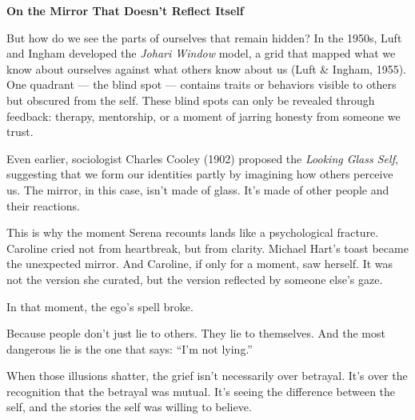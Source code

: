 \begin{PsychologicalSidebar}{\textbf{On the Mirror That Doesn’t Reflect Itself}}
  \medskip
  
  But how do we see the parts of ourselves that remain hidden? In the 1950s, Luft and Ingham 
  developed the \textit{Johari Window} model, a grid that mapped what we know about ourselves 
  against what others know about us (Luft \& Ingham, 1955). One quadrant --- the blind spot --- 
  contains traits or behaviors visible to others but obscured from the self. These blind spots 
  can only be revealed through feedback: therapy, mentorship, or a moment of jarring honesty from 
  someone we trust.
  
  \medskip
  
  Even earlier, sociologist Charles Cooley (1902) proposed the \textit{Looking Glass Self}, 
  suggesting that we form our identities partly by imagining how others perceive us. The mirror, 
  in this case, isn’t made of glass. It’s made of other people and their reactions.
  
  \medskip
  
  This is why the moment Serena recounts lands like a psychological fracture. Caroline cried not 
  from heartbreak, but from clarity. Michael Hart’s toast became the unexpected mirror. And 
  Caroline, if only for a moment, saw herself. It was not the version she curated, but the version 
  reflected by someone else’s gaze.
  
  \medskip
  
  In that moment, the ego’s spell broke.
  
  \medskip
  
  Because people don’t just lie to others.
  They lie to themselves.
  And the most dangerous lie is the one that says: ``I’m not lying.''
  
  \medskip
  
  When those illusions shatter, the grief isn’t necessarily over betrayal.
  It’s over the recognition that the betrayal was mutual.
  It's seeing the difference between the self, and the stories the self was willing to believe.
  
\end{PsychologicalSidebar}
